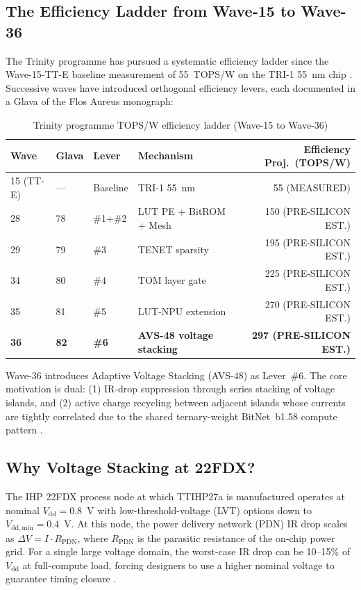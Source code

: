 \subsection{The Efficiency Ladder from Wave-15 to Wave-36}

The Trinity programme has pursued a systematic efficiency ladder since the
Wave-15-TT-E baseline measurement of 55~TOPS/W on the TRI-1 55~nm chip
\cite{bitnet_b158_2024}.  Successive waves have introduced orthogonal
efficiency levers, each documented in a Glava of the Flos Aureus monograph:

\begin{table}[ht]
\centering
\caption{Trinity programme TOPS/W efficiency ladder (Wave-15 to Wave-36)}
\label{tab:tops_w_ladder}
\begin{tabular}{llllr}
\hline
Wave & Glava & Lever & Mechanism & Efficiency Proj.\ (TOPS/W) \\
\hline
15 (TT-E) & ---   & Baseline  & TRI-1 55~nm            &  55 (MEASURED)             \\
28        & 78    & \#1+\#2   & LUT PE + BitROM + Mesh & 150 (PRE-SILICON EST.)     \\
29        & 79    & \#3       & TENET sparsity         & 195 (PRE-SILICON EST.)     \\
34        & 80    & \#4       & TOM layer gate         & 225 (PRE-SILICON EST.)     \\
35        & 81    & \#5       & LUT-NPU extension      & 270 (PRE-SILICON EST.)     \\
\textbf{36} & \textbf{82} & \textbf{\#6} & \textbf{AVS-48 voltage stacking} &
             \textbf{297 (PRE-SILICON EST.)} \\
\hline
\end{tabular}
\end{table}

Wave-36 introduces Adaptive Voltage Stacking (AVS-48) as Lever~\#6.  The
core motivation is dual: (1) IR-drop suppression through series stacking of
voltage islands, and (2) active charge recycling between adjacent islands
whose currents are tightly correlated due to the shared ternary-weight
BitNet~b1.58 compute pattern \cite{bitnet_b158_2024}.

\subsection{Why Voltage Stacking at 22FDX?}

The IHP 22FDX process node at which TTIHP27a is manufactured operates at
nominal $V_\mathrm{dd} = 0.8$~V with low-threshold-voltage (LVT) options
down to $V_\mathrm{dd,min} = 0.4$~V.  At this node, the power delivery
network (PDN) IR drop scales as $\Delta V = I \cdot R_\mathrm{PDN}$, where
$R_\mathrm{PDN}$ is the parasitic resistance of the on-chip power grid.
For a single large voltage domain, the worst-case IR drop can be
10--15\% of $V_\mathrm{dd}$ at full-compute load, forcing designers to
use a higher nominal voltage to guarantee timing closure
\cite{irds2023}.


